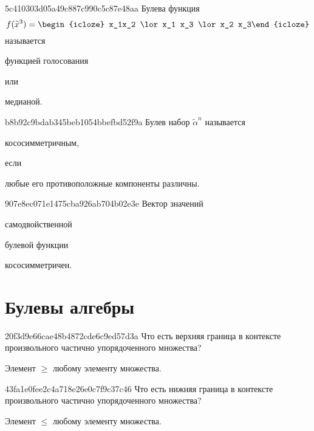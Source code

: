 \begin{note}{5c410303d05a49c887c990c5c87e48aa}
    Булева функция
    \[
        f(\widetilde x^{3}) = \begin{icloze}{2}x_1x_2 \lor x_1 x_3 \lor x_2 x_3\end{icloze}
    \]
    называется \begin{icloze}{1}функцией голосования\end{icloze} или \begin{icloze}{1}медианой.\end{icloze}
\end{note}

\begin{note}{b8b92c9bdab345beb1054bbefbd52f9a}
    Булев набор \({ \widetilde \alpha^{n} }\) называется \begin{icloze}{2}кососимметричным,\end{icloze} если \begin{icloze}{1}любые его противоположные компоненты различны.\end{icloze}
\end{note}

\begin{note}{907e8ec071e1475cba926ab704b02e3e}
    Вектор значений \begin{icloze}{2}самодвойственной\end{icloze} булевой функции \begin{icloze}{1}кососимметричен.\end{icloze}
\end{note}

\section{Булевы алгебры}
\begin{note}{20f3d9e66cae48b4872cde6c9ed57d3a}
    Что есть верхняя граница в контексте произвольного частично упорядоченного множества?

    \begin{cloze}{1}
        Элемент \({ \geqslant }\) любому элементу множества.
    \end{cloze}
\end{note}

\begin{note}{43fa1e0fee2c4a718e26e0c7f9c37c46}
    Что есть нижняя граница в контексте произвольного частично упорядоченного множества?

    \begin{cloze}{1}
        Элемент \({ \leqslant }\) любому элементу множества.
    \end{cloze}
\end{note}

